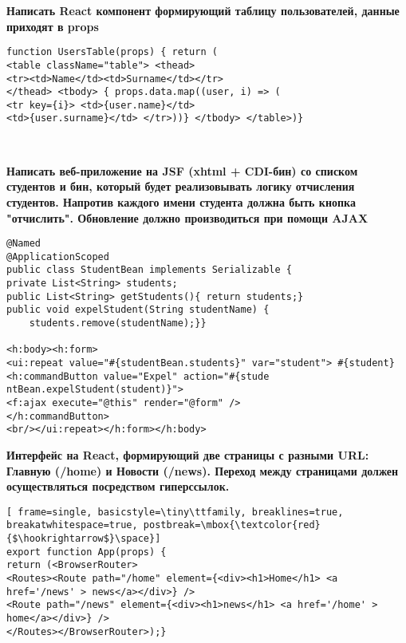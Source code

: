 \documentclass{article}
\begin{document}
\hfill
\begin{minipage}[t]{0.3\textwidth}
    \textbf{Написать React компонент формирующий таблицу пользователей, данные приходят в props}
\begin{lstlisting}[frame=single, basicstyle=\tiny\ttfamily, breaklines=true, breakatwhitespace=true, postbreak=\mbox{\textcolor{red}{$\hookrightarrow$}\space}]
function UsersTable(props) { return (
<table className="table"> <thead>
<tr><td>Name</td><td>Surname</td></tr>
</thead> <tbody> { props.data.map((user, i) => (
<tr key={i}> <td>{user.name}</td>
<td>{user.surname}</td> </tr>))} </tbody> </table>)}
\end{lstlisting}
\end{minipage}%
\\

\begin{minipage}[t]{0.3\textwidth}
    \textbf{Написать веб-приложение на JSF (xhtml + CDI-бин) со списком студентов и бин, который будет реализовывать логику отчисления студентов. Напротив каждого имени студента должна быть кнопка "отчислить". Обновление должно производиться при помощи AJAX}
    \begin{lstlisting}[frame=single, basicstyle=\tiny\ttfamily, breaklines=true, breakatwhitespace=true, postbreak=\mbox{\textcolor{red}{$\hookrightarrow$}\space}]
@Named
@ApplicationScoped
public class StudentBean implements Serializable {
private List<String> students;
public List<String> getStudents(){ return students;}
public void expelStudent(String studentName) {
    students.remove(studentName);}}
    
<h:body><h:form>
<ui:repeat value="#{studentBean.students}" var="student"> #{student}
<h:commandButton value="Expel" action="#{stude ntBean.expelStudent(student)}">
<f:ajax execute="@this" render="@form" />
</h:commandButton>
<br/></ui:repeat></h:form></h:body>
    \end{lstlisting}
\end{minipage}%
\hfill
\begin{minipage}[t]{0.3\textwidth}
    \textbf{Интерфейс на React, формирующий две страницы с разными URL: Главную (/home) и Новости (/news). Переход между страницами должен осуществляться посредством гиперссылок.}
    \begin{lstlisting}[ frame=single, basicstyle=\tiny\ttfamily, breaklines=true, breakatwhitespace=true, postbreak=\mbox{\textcolor{red}{$\hookrightarrow$}\space}]
export function App(props) {
return (<BrowserRouter>
<Routes><Route path="/home" element={<div><h1>Home</h1> <a href='/news' > news</a></div>} />
<Route path="/news" element={<div><h1>news</h1> <a href='/home' > home</a></div>} />
</Routes></BrowserRouter>);}
    \end{lstlisting}
\end{minipage}%
\end{document}
